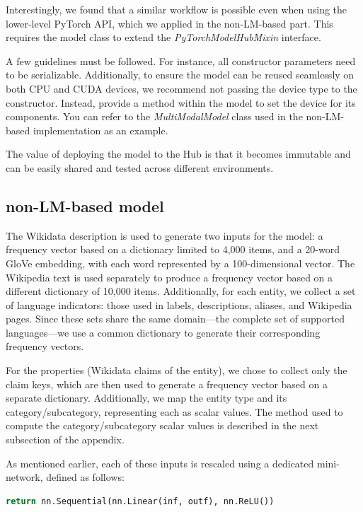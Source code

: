 \documentclass[11pt]{article}
\begin{document}
	Interestingly, we found that a similar workflow is possible even when using the lower-level PyTorch API, which we applied in the non-LM-based part. This requires the model class to extend the \emph{PyTorchModelHubMixin} interface.
	
	A few guidelines must be followed. For instance, all constructor parameters need to be serializable. Additionally, to ensure the model can be reused seamlessly on both CPU and CUDA devices, we recommend not passing the device type to the constructor. Instead, provide a method within the model to set the device for its components. You can refer to the  \emph{MultiModalModel} class used in the non-LM-based implementation as an example.
	
	The value of deploying the model to the Hub is that it becomes immutable and can be easily shared and tested across different environments.
	
	\subsection{non-LM-based model}

	The Wikidata description is used to generate two inputs for the model: a frequency vector based on a dictionary limited to 4,000 items, and a 20-word GloVe embedding, with each word represented by a 100-dimensional vector. The Wikipedia text is used separately to produce a frequency vector based on a different dictionary of 10,000 items. Additionally, for each entity, we collect a set of language indicators: those used in labels, descriptions, aliases, and Wikipedia pages. Since these sets share the same domain—the complete set of supported languages—we use a common dictionary to generate their corresponding frequency vectors.
	
	For the properties (Wikidata claims of the entity), we chose to collect only the claim keys, which are then used to generate a frequency vector based on a separate dictionary. Additionally, we map the entity type and its category/subcategory, representing each as scalar values. The method used to compute the category/subcategory scalar values is described in the next subsection of the appendix.
	
	As mentioned earlier, each of these inputs is rescaled using a dedicated mini-network, defined as follows:
	
	\scriptsize
	\begin{lstlisting}[language=python]
return nn.Sequential(nn.Linear(inf, outf), nn.ReLU())
	\end{lstlisting}
	\normalsize
	
\end{document}
